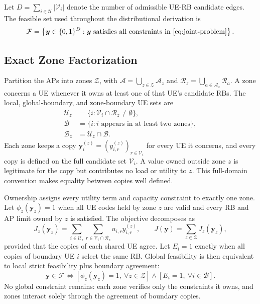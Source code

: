 \documentclass[journal]{IEEEtran}
\newcommand{\calF}{\mathcal{F}}  %
\newcommand{\calV}{\mathcal{V}}  %
\newcommand{\calU}{\mathcal{U}}  %
\newcommand{\calZ}{\mathcal{Z}}  %
\newcommand{\calB}{\mathcal{B}}  %
\newcommand{\calA}{\mathcal{A}}  %
\newcommand{\calR}{\mathcal{R}}  %
\begin{document}
Let $D=\sum_{i\in\calU}|\calV_i|$ denote the number of admissible UE-RB candidate edges. The feasible set used throughout the distributional derivation is
\begin{equation}
\label{eq:feasible}
\calF=
\left\{
\bm y\in\{0,1\}^{D}:
\bm y\text{ satisfies all constraints in~\eqref{eq:joint-problem}}
\right\}.
\end{equation}

\subsection{Exact Zone Factorization}
\label{sec:factorization}

Partition the APs into zones $\calZ$, with $\calA=\bigcup_{z\in\calZ}\calA_z$ and $\calR_z=\bigcup_{a\in\calA_z}\calR_a$. A zone concerns a UE whenever it owns at least one of that UE's candidate RBs. The local, global-boundary, and zone-boundary UE sets are
\begin{equation}
\label{eq:zone-sets}
\begin{aligned}
\calU_z&=\{i:\calV_i\cap\calR_z\ne\emptyset\},\\
\calB&=\{i:i\text{ appears in at least two zones}\},\\
\calB_z&=\calU_z\cap\calB.
\end{aligned}
\end{equation}
Each zone keeps a copy $\bm y_i^{(z)}=(y_{i,r}^{(z)})_{r\in\calV_i}$ for every UE it concerns, and every copy is defined on the full candidate set $\calV_i$. A value owned outside zone $z$ is legitimate for the copy but contributes no load or utility to $z$. This full-domain convention makes equality between copies well defined.

Ownership assigns every utility term and capacity constraint to exactly one zone. Let $\phi_z(\bm y_z)=1$ when all UE codes held by zone $z$ are valid and every RB and AP limit owned by $z$ is satisfied. The objective decomposes as
\begin{equation}
\label{eq:local-utility}
J_z(\bm y_z)=
\sum_{i\in\calU_z}\sum_{r\in\calV_i\cap\calR_z}
 u_{i,r}y_{i,r}^{(z)},
\qquad
J(\bm y)=\sum_{z\in\calZ}J_z(\bm y_z),
\end{equation}
provided that the copies of each shared UE agree. Let $E_i=1$ exactly when all copies of boundary UE $i$ select the same RB. Global feasibility is then equivalent to local strict feasibility plus boundary agreement:
\begin{equation}
\label{eq:factorization}
\bm y\in\calF
\iff
\left[\phi_z(\bm y_z)=1,\ \forall z\in\calZ\right]
\land
\left[E_i=1,\ \forall i\in\calB\right].
\end{equation}
No global constraint remains: each zone verifies only the constraints it owns, and zones interact solely through the agreement of boundary copies.
\end{document}
